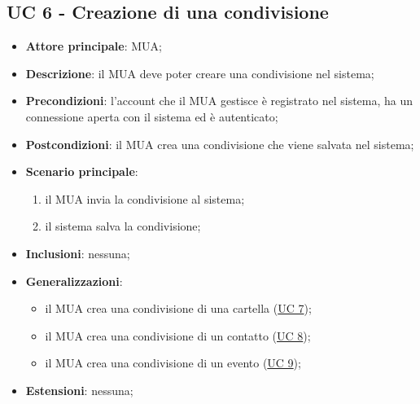 \subsection{UC 6 - Creazione di una condivisione} \label{sec:UC6}
    \begin{itemize}
        \item \textbf{Attore principale}: MUA;
        \item \textbf{Descrizione}: il MUA deve poter creare una condivisione nel sistema;
        \item \textbf{Precondizioni}: l’account che il MUA gestisce è registrato nel sistema, ha un connessione aperta con il sistema ed è autenticato;
        \item \textbf{Postcondizioni}: il MUA crea una condivisione che viene salvata nel sistema;
        \item \textbf{Scenario principale}:
        \begin{enumerate}
            \item il MUA invia la condivisione al sistema;
            \item il sistema salva la condivisione;
        \end{enumerate}
    \item \textbf{Inclusioni}: nessuna;
    \item \textbf{Generalizzazioni}:
        \begin{itemize}
            \item il MUA crea una condivisione di una cartella (\hyperref[sec:UC7]{UC 7});
            \item il MUA crea una condivisione di un contatto (\hyperref[sec:UC8]{UC 8});
            \item il MUA crea una condivisione di un evento (\hyperref[sec:UC9]{UC 9});
        \end{itemize}
    \item \textbf{Estensioni}: nessuna;
\end{itemize}